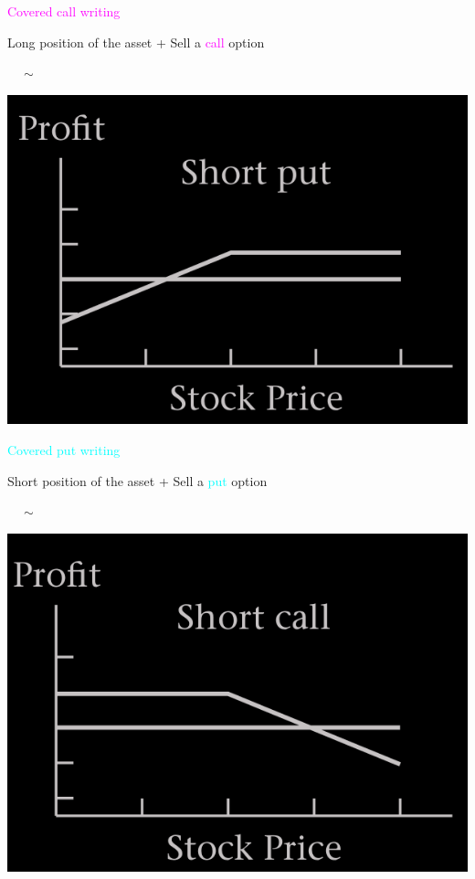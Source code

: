 \begin{frame}[fragile]
\begin{center}

	\begin{minipage}{0.6\textwidth}
		\centering

		\textcolor{magenta}{Covered call writing}
		\bigskip

		Long position of the asset  + Sell a \textcolor{magenta}{call} option
	\end{minipage}
	$ \quad  \sim$
	\begin{minipage}{0.3\textwidth}
		\includegraphics[scale=0.15]{figs/Short-put.png}
	\end{minipage}

	\mySeparateLine
	\bigskip

	\begin{minipage}{0.6\textwidth}
		\centering

		\textcolor{cyan}{Covered put writing}
		\bigskip

		Short position of the asset  + Sell a \textcolor{cyan}{put} option
	\end{minipage}
	$ \quad  \sim$
	\begin{minipage}{0.3\textwidth}
		\includegraphics[scale=0.15]{figs/Short-call.png}
	\end{minipage}


\end{center}
\end{frame}
